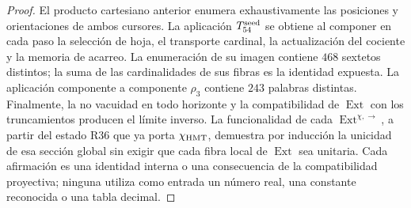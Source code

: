 \begin{proof}
El producto cartesiano anterior enumera exhaustivamente las posiciones y
orientaciones de ambos cursores. La aplicación \(T_{54}^{\rm seed}\) se obtiene al
componer en cada paso la selección de hoja, el transporte cardinal, la
actualización del cociente y la memoria de acarreo. La enumeración de su
imagen contiene \(468\) sextetos distintos; la suma de las cardinalidades de
sus fibras es la identidad expuesta. La aplicación componente a componente
\(\rho_3\) contiene \(243\) palabras distintas. Finalmente, la no vacuidad en
todo horizonte y la compatibilidad de \(\operatorname{Ext}\) con los
truncamientos producen el límite inverso. La funcionalidad de cada
\(\operatorname{Ext}^{\chi,\rightarrow}\), a partir del estado R36 que ya
porta \(\chi_{\rm HMT}\), demuestra por inducción la unicidad de esa sección
global sin exigir que cada fibra local de \(\operatorname{Ext}\) sea
unitaria. Cada afirmación es una identidad interna o una consecuencia de la
compatibilidad proyectiva; ninguna utiliza como entrada un número real, una
constante reconocida o una tabla decimal.
\end{proof}

